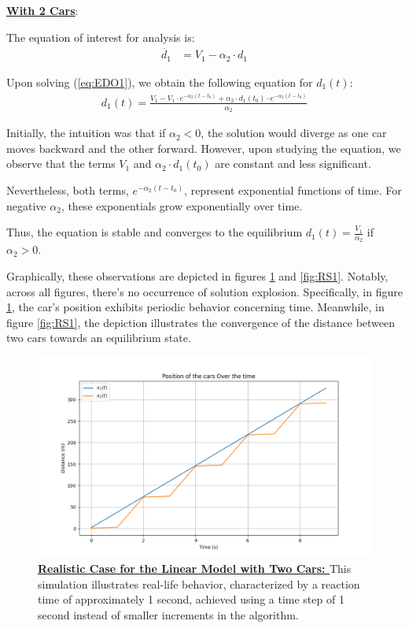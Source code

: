 \documentclass{article}
\begin{document}
		\textbf{\underline{With 2 Cars}}:
		
		The equation of interest for analysis is:
		\begin{align*}
			\dot{d_1} &= V_1 - \alpha_2 \cdot d_1
		\end{align*}
		
		Upon solving (\ref{eq:EDO1}), we obtain the following equation for \(d_1(t)\):
		\begin{align*}
			\boxed{d_1(t) = \frac{{V_1 - V_1 \cdot e^{-\alpha_2(t-t_0)} + \alpha_2 \cdot d_1(t_0) \cdot e^{-\alpha_2(t-t_0)}}}{\alpha_2}}
		\end{align*}
		
		Initially, the intuition was that if \(\alpha_2 < 0\), the solution would diverge as one car moves backward and the other forward. However, upon studying the equation, we observe that the terms \(V_1\) and \(\alpha_2 \cdot d_1(t_0)\) are constant and less significant.
		
		Nevertheless, both terms, \(e^{-\alpha_2(t-t_0)}\), represent exponential functions of time. For negative \(\alpha_2\), these exponentials grow exponentially over time.
		
		Thus, the equation is stable and converges to the equilibrium \(\boxed{d_1(t)=\frac{V_1}{\alpha_2}}\) if \(\alpha_2 > 0\).
		
		Graphically, these observations are depicted in figures \ref{fig:RC1} and \ref{fig:RS1}. Notably, across all figures, there's no occurrence of solution explosion. Specifically, in figure \ref{fig:RC1}, the car's position exhibits periodic behavior concerning time. Meanwhile, in figure \ref{fig:RS1}, the depiction illustrates the convergence of the distance between two cars towards an equilibrium state.
		
		\begin{figure}[H]
			\centering
			\includegraphics[width=0.8\linewidth]{RealisticCase.png}
			\caption[Realistic Case for the Linear Model with Two Cars]{\textbf{\underline{Realistic Case for the Linear Model with Two Cars: }}This simulation illustrates real-life behavior, characterized by a reaction time of approximately 1 second, achieved using a time step of 1 second instead of smaller increments in the algorithm.}
			\label{fig:RC1}
		\end{figure}
		
\end{document}
